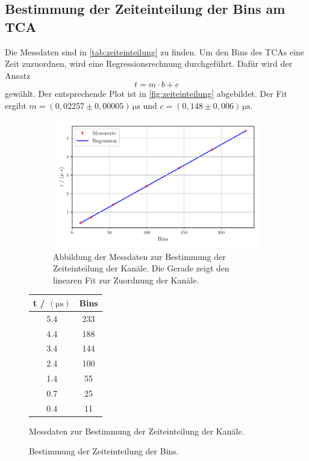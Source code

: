 \subsection{Bestimmung der Zeiteinteilung der Bins am TCA} \label{sec:zeiteinteilung}

Die Messdaten sind in \autoref{tab:zeiteinteilung} zu finden.
Um den Bins des TCAs eine Zeit zuzuordnen, wird eine Regressionsrechnung durchgeführt.
Dafür wird der Ansatz
\begin{equation*}
    t = m \cdot b + c
\end{equation*}
gewählt.
Der entsprechende Plot ist in \autoref{fig:zeiteinteilung} abgebildet.
Der Fit ergibt 
$m = (0{,}02257 \pm 0{,}00005) \, \unit{\micro\second}$ und $c = (0{,}148 \pm 0{,}006) \, \unit{\micro\second}$.


\begin{figure}%
    \begin{subfigure}{0.68\textwidth}%
    \centering%
    \includegraphics[width=\textwidth]{build/zeiteinteilung.pdf}%
    \caption{Abbildung der Messdaten zur Bestimmung der Zeiteinteilung der Kanäle. Die Gerade zeigt den linearen Fit zur Zuordnung der Kanäle.}%
    \label{fig:zeiteinteilung}%
    \end{subfigure}%
    \hfill%
    \begin{subtable}{0.28\textwidth}%
        \centering
        \begin{tabular}{c c}
        \toprule
        t / $(\unit{\micro\second})$ &  Bins \\
        \midrule
         5.4 & 233 \\
         4.4 & 188 \\
         3.4 & 144 \\
         2.4 & 100 \\
         1.4 &  55 \\
         0.7 &  25 \\
         0.4 &  11 \\
        \bottomrule
        \end{tabular}
        \caption{Messdaten zur Bestimmung der Zeiteinteilung der Kanäle.}
        \label{tab:zeiteinteilung}
    \end{subtable}%
    \caption{Bestimmung der Zeiteinteilung der Bins.}
    \label{subfig:zeiteinteilung}    
\end{figure}%
    
